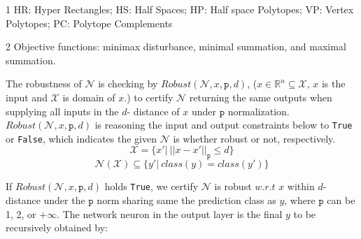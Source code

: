 \begin{table}[!ht]
\begin{threeparttable}
    \begin{tablenotes}
        \item[1] HR: Hyper Rectangles; HS: Half Spaces; HP: Half space Polytopes; VP: Vertex Polytopes; PC: Polytope Complements \\
        \item[2] Objective functions: minimax disturbance, minimal summation, and maximal summation.
    \end{tablenotes}
    \label{tab:verification_method_summary}
\end{threeparttable}
\end{table}

The robustness of $\mathcal{N}$ is checking by $Robust(\mathcal{N},x,\mathtt{p},d)$, ($x\in \mathbb{R}^n \subseteq \mathcal{X}$, $x$ is the input and $\mathcal{X}$ is domain of $x$.) to certify $\mathcal{N}$ returning the same outputs when supplying all inputs in the $d$- distance of $x$ under $\mathtt{p}$ normalization. $Robust(\mathcal{N},x,\mathtt{p},d)$ is reasoning the input and output constraints below to \texttt{True} or \texttt{False}, which indicates the given $\mathcal{N}$ is whether robust or not, respectively.
\begin{equation}
    \mathcal{X} = \{ x' |\ ||x-x'||_{\mathtt{p}} \leq d \}
\end{equation}
\begin{equation}
    \mathcal{N(X)} \subseteq \{ y'|\ class(y) = class(y') \}
\end{equation}

If $Robust(\mathcal{N},x,\mathtt{p},d)$ holds \texttt{True}, we certify $\mathcal{N}$ is robust $w.r.t$ $x$ within $d$- distance under the $\mathtt{p}$ norm sharing same the prediction class as $y$, where $\mathtt{p}$ can be 1, 2, or $+\infty$. The network neuron in the output layer is the final $y$ to be recursively obtained by: 


